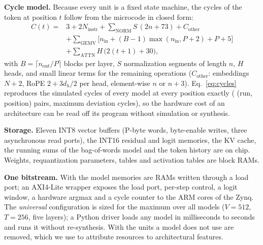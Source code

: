 \textbf{Cycle model.} Because every unit is a fixed state machine, the cycles of the token at position $t$ follow
from the microcode in closed form:
\begin{equation}
\begin{aligned}
C(t) ={}& 3 + 2N_\mathrm{instr} + \textstyle\sum_\mathrm{NORM} S\,(2n + 73) + C_\mathrm{other}\\
&+ \textstyle\sum_\mathrm{GEMV}\big[n_\mathrm{in} + (B-1)\max(n_\mathrm{in},P{+}2) + P + 5\big]\\
&+ \textstyle\sum_\mathrm{ATTN} H\,\big(2(t+1) + 30\big),
\end{aligned}
\label{eq:cycles}
\end{equation}
with $B=\lceil n_\mathrm{out}/P\rceil$ blocks per layer, $S$ normalization segments of length $n$, $H$ heads, and small
linear terms for the remaining operations ($C_\mathrm{other}$: embeddings $N{+}2$, RoPE $2+3d_h/2$ per head, element-wise
$n$ or $n{+}3$). Eq.~\eqref{eq:cycles} reproduces the simulated cycles of every model at every position exactly
(\zooPerfPairs{} (run, position) pairs, maximum deviation \zooPerfMaxErr{} cycles), so the hardware cost of an
architecture can be read off its program without simulation or synthesis.

\textbf{Storage.} Eleven INT8 vector buffers (P-byte words, byte-enable writes, three asynchronous read ports), the INT16
residual and logit memories, the KV cache, the running sums of the bag-of-words model and the token history are on chip.
Weights, requantization parameters, tables and activation tables are block RAMs.

\textbf{One bitstream.} With  the model memories are RAMs written through a load port; an AXI4-Lite wrapper
exposes the load port, per-step control, a logit window, a hardware argmax and a cycle counter to the ARM cores of the
Zynq. The \emph{universal} configuration is sized for the maximum over all models ($V=512$, $T=256$, five layers); a
Python driver loads any model in milliseconds to seconds and runs it without re-synthesis. With  the
units a model does not use are removed, which we use to attribute resources to architectural features.
